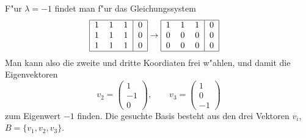 \begin{loesung}
F"ur $\lambda=-1$ findet man f"ur das Gleichungssystem
\begin{align*}
\begin{tabular}{|ccc|c|}
\hline
1&1&1&0\\
1&1&1&0\\
1&1&1&0\\
\hline
\end{tabular}
&\rightarrow
\begin{tabular}{|ccc|c|}
\hline
1&1&1&0\\
0&0&0&0\\
0&0&0&0\\
\hline
\end{tabular}
\end{align*}
Man kann also die zweite und dritte Koordiaten frei w"ahlen, und damit
die Eigenvektoren
\[
v_2=\begin{pmatrix}1\\-1\\0\end{pmatrix},\qquad
v_3=\begin{pmatrix}1\\0\\-1\end{pmatrix}
\]
zum Eigenwert $-1$ finden. Die gesuchte Basis besteht aus den
drei Vektoren $v_i$, $B=\{v_1,v_2,v_3\}$.
\end{loesung}

